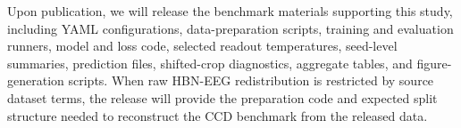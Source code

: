 \documentclass[12pt]{article}
\begin{document}
Upon publication, we will release the benchmark materials supporting this study, including YAML configurations, data-preparation scripts, training and evaluation runners, model and loss code, selected readout temperatures, seed-level summaries, prediction files, shifted-crop diagnostics, aggregate tables, and figure-generation scripts. When raw HBN-EEG redistribution is restricted by source dataset terms, the release will provide the preparation code and expected split structure needed to reconstruct the CCD benchmark from the released data.


\FloatBarrier







% 




\end{document}
